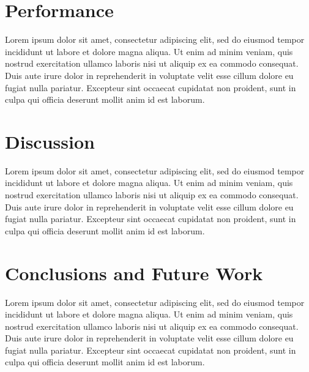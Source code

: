 \documentclass{acm_proc_article-sp}
\begin{document}
\section{Performance}

Lorem ipsum dolor sit amet, consectetur adipiscing elit, sed do eiusmod tempor incididunt ut labore et dolore magna aliqua. Ut enim ad minim veniam, quis nostrud exercitation ullamco laboris nisi ut aliquip ex ea commodo consequat. Duis aute irure dolor in reprehenderit in voluptate velit esse cillum dolore eu fugiat nulla pariatur. Excepteur sint occaecat cupidatat non proident, sunt in culpa qui officia deserunt mollit anim id est laborum.


\section{Discussion}

Lorem ipsum dolor sit amet, consectetur adipiscing elit, sed do eiusmod tempor incididunt ut labore et dolore magna aliqua. Ut enim ad minim veniam, quis nostrud exercitation ullamco laboris nisi ut aliquip ex ea commodo consequat. Duis aute irure dolor in reprehenderit in voluptate velit esse cillum dolore eu fugiat nulla pariatur. Excepteur sint occaecat cupidatat non proident, sunt in culpa qui officia deserunt mollit anim id est laborum.



\section{Conclusions and Future Work}

Lorem ipsum dolor sit amet, consectetur adipiscing elit, sed do eiusmod tempor incididunt ut labore et dolore magna aliqua. Ut enim ad minim veniam, quis nostrud exercitation ullamco laboris nisi ut aliquip ex ea commodo consequat. Duis aute irure dolor in reprehenderit in voluptate velit esse cillum dolore eu fugiat nulla pariatur. Excepteur sint occaecat cupidatat non proident, sunt in culpa qui officia deserunt mollit anim id est laborum.


% 





\end{document}
